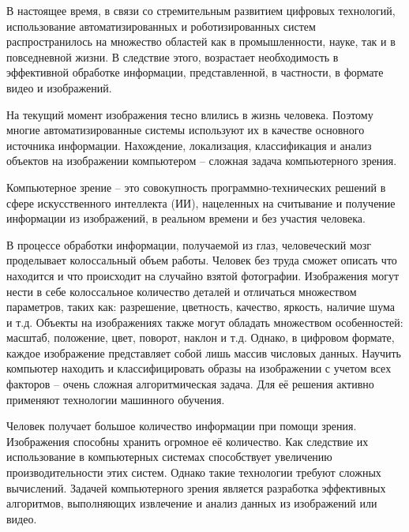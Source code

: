 В настоящее время, в связи со стремительным развитием цифровых технологий, использование автоматизированных и роботизированных систем распространилось на множество областей как в промышленности, науке, так и в повседневной жизни. В следствие этого, возрастает необходимость в эффективной обработке информации, представленной, в частности, в формате видео и изображений. 

На текущий момент изображения тесно влились в жизнь человека. Поэтому многие автоматизированные системы используют их в качестве основного источника информации. Нахождение, локализация, классификация и анализ объектов на изображении компьютером – сложная задача компьютерного зрения. 

Компьютерное зрение – это совокупность программно-технических решений в сфере искусственного интеллекта (ИИ), нацеленных на считывание и получение информации из изображений, в реальном времени и без участия человека. 

В процессе обработки информации, получаемой из глаз, человеческий мозг проделывает колоссальный объем работы. Человек без труда сможет описать что находится и что происходит на случайно взятой фотографии. Изображения могут нести в себе колоссальное количество деталей и отличаться множеством параметров, таких как: разрешение, цветность, качество, яркость, наличие шума и т.д. Объекты на изображениях также могут обладать множеством особенностей: масштаб, положение, цвет, поворот, наклон и т.д. Однако, в цифровом формате, каждое изображение представляет собой лишь массив числовых данных.  Научить компьютер находить и классифицировать образы на изображении с учетом всех факторов – очень сложная алгоритмическая задача. Для её решения активно применяют технологии машинного обучения.

Человек получает большое количество информации при помощи зрения. 
Изображения способны хранить огромное её количество. Как следствие их использование в компьютерных системах способствует увеличению производительности этих систем. Однако такие технологии требуют сложных вычислений. Задачей компьютерного зрения является разработка эффективных алгоритмов, выполняющих извлечение и анализ данных из изображений или видео. 
 
